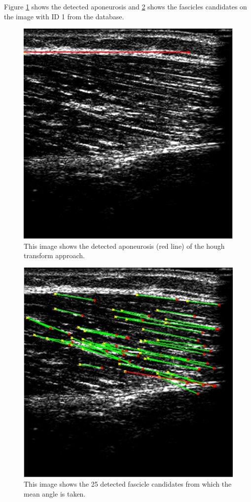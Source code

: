 \documentclass[10pt,twocolumn,letterpaper]{article}
\begin{document}
Figure \ref{fig:im1_hough_apo} shows the detected aponeurosis and \ref{fig:im1_hough_fibers} shows the fascicles candidates on the image with ID 1 from the database.

\begin{figure}
	\begin{center}		
		\includegraphics[width=0.7\linewidth]{img/im1_hough_apo}
	\end{center}
	\caption{This image shows the detected aponeurosis (red line) of the hough transform approach.}
	\label{fig:im1_hough_apo}
	
\end{figure}

\begin{figure}
	\begin{center}		
		\includegraphics[width=0.7\linewidth]{img/im1_hough_fibers}
	\end{center}
	\caption{This image shows the 25 detected fascicle candidates from which the mean angle is taken.}
	\label{fig:im1_hough_fibers}
	
\end{figure}
\end{document}
